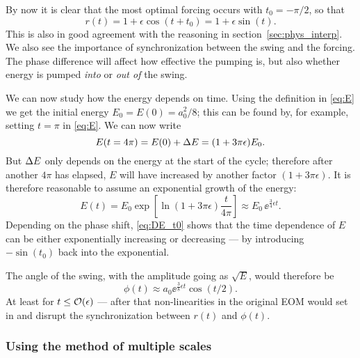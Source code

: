 By now it is clear that the most optimal forcing occurs with
$t_0=-\pi/2$, so that
\begin{equation}\label{eq:r}
r(t)=1+\epsilon\cos(t+t_0)=1+\epsilon\sin(t).
\end{equation}
This is also in good agreement with the reasoning in
section~\ref{sec:phys_interp}. We also see the importance of
synchronization between the swing and the forcing. The phase
difference will affect how effective the pumping is, but also whether
energy is pumped \emph{into} or \emph{out of} the swing.

We can now study how the energy depends on time. Using the
definition in \eqref{eq:E} we get the initial energy $E_0=E(0)=a_0^2/8$; this can be
found by, for example, setting $t=\pi$ in \eqref{eq:E}. We can now write
\begin{equation}\label{eq:E(4pi)}
E(t=4\pi)=E(0)+\Delta{E}=(1+3\pi\epsilon)E_0.
\end{equation}
But $\Delta{E}$ only depends on the energy at the start of the cycle;
therefore after another $4\pi$ has elapsed, $E$ will have increased by
another factor $(1+3\pi\epsilon)$. 
It is therefore reasonable to assume an exponential growth of the
energy: 
\begin{equation}\label{eq:E(t)}
E(t)=E_0\exp[\ln(1+3\pi\epsilon)\frac{t}{4\pi}]
\approx E_0\,\ee^{\frac{3}{4}\epsilon t}.
\end{equation}
Depending on the phase shift, \eqref{eq:DE_t0} shows that the time
dependence of $E$ can be either exponentially increasing or
decreasing --- by introducing $-\!\sin(t_0)$ back into the exponential. 

The angle of the swing, with the amplitude going as
$\sqrt{E}$, would therefore be 
\begin{equation}\label{eq:phi_from_E}
\phi(t)\approx a_0\ee^{\frac{3}{8}\epsilon t}\cos(t/2).
\end{equation}
At least for $t\le\order{\epsilon}$ --- after that non-linearities in the
original EOM would set in and disrupt the synchronization between $r(t)$ and
$\phi(t)$. 



\subsubsection{Using the method of multiple scales}

